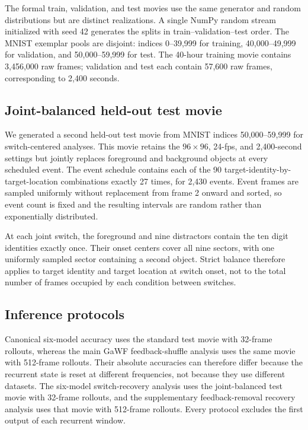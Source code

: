 The formal train, validation, and test movies use the same generator and random distributions but are distinct realizations. A single NumPy random stream initialized with seed 42 generates the splits in train--validation--test order. The MNIST exemplar pools are disjoint: indices 0--39,999 for training, 40,000--49,999 for validation, and 50,000--59,999 for test. The 40-hour training movie contains 3,456,000 raw frames; validation and test each contain 57,600 raw frames, corresponding to 2,400 seconds.

\subsection{Joint-balanced held-out test movie}

We generated a second held-out test movie from MNIST indices 50,000--59,999 for switch-centered analyses. This movie retains the \(96\times96\), 24-fps, and 2,400-second settings but jointly replaces foreground and background objects at every scheduled event. The event schedule contains each of the 90 target-identity-by-target-location combinations exactly 27 times, for 2,430 events. Event frames are sampled uniformly without replacement from frame 2 onward and sorted, so event count is fixed and the resulting intervals are random rather than exponentially distributed.

At each joint switch, the foreground and nine distractors contain the ten digit identities exactly once. Their onset centers cover all nine sectors, with one uniformly sampled sector containing a second object. Strict balance therefore applies to target identity and target location at switch onset, not to the total number of frames occupied by each condition between switches.

\subsection{Inference protocols}

Canonical six-model accuracy uses the standard test movie with 32-frame rollouts, whereas the main GaWF feedback-shuffle analysis uses the same movie with 512-frame rollouts. Their absolute accuracies can therefore differ because the recurrent state is reset at different frequencies, not because they use different datasets. The six-model switch-recovery analysis uses the joint-balanced test movie with 32-frame rollouts, and the supplementary feedback-removal recovery analysis uses that movie with 512-frame rollouts. Every protocol excludes the first output of each recurrent window.

